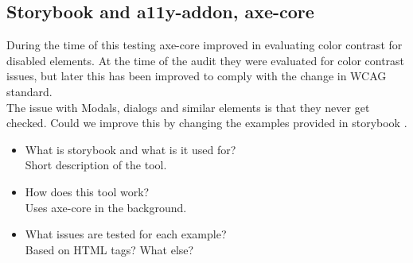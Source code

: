 \documentclass{master_thesis}
\begin{document}
\subsection{Storybook and a11y-addon, axe-core}

During the time of this testing axe-core improved in evaluating color contrast for disabled elements. At the time of the audit they were evaluated for color contrast issues, but later this has been improved to comply with the change in WCAG standard.\\

The issue with Modals, dialogs and similar elements is that they never get checked. Could we improve this by changing the examples provided in storybook \citep{DequeSystems2021}. \autocite{Sane2021}
\begin{itemize}
	\item What is storybook and what is it used for?\\
	Short description of the tool.
	\item How does this tool work?\\
	Uses axe-core in the background.
	\item What issues are tested for each example? \\
	Based on HTML tags? What else?
\end{itemize}
\end{document}
